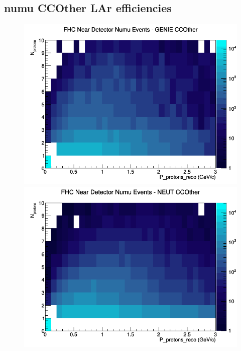 \documentclass[12pt]{article}
\begin{document}
\subsection{numu CCOther LAr efficiencies}
\begin{figure}[h]
\includegraphics[width=\linewidth]{eff_N_P/LAr/protons/CCOther_FHC_ND_numu_N_P_GENIE.png}
\endminipage
{}
\includegraphics[width=\linewidth]{eff_N_P/LAr/protons/CCOther_FHC_ND_numu_N_P_NEUT.png}
\endminipage
{}

\end{figure}
\end{document}

